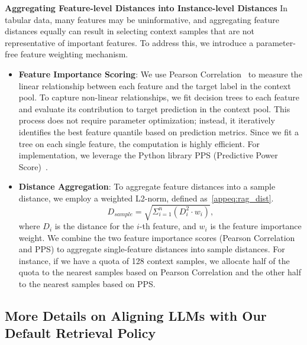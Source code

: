 \textbf{Aggregating Feature-level Distances into Instance-level Distances}
In tabular data, many features may be uninformative, and aggregating feature distances equally can result in selecting context samples that are not representative of important features. To address this, we introduce a parameter-free feature weighting mechanism.
\begin{itemize}
    \item \textbf{Feature Importance Scoring}: We use Pearson Correlation~\citep{cohen2009pearson} to measure the linear relationship between each feature and the target label in the context pool. To capture non-linear relationships, we fit decision trees to each feature and evaluate its contribution to target prediction in the context pool. This process does not require parameter optimization; instead, it iteratively identifies the best feature quantile based on prediction metrics. Since we fit a tree on each single feature, the computation is highly efficient. For implementation, we leverage the Python library PPS (Predictive Power Score)~\citep{florian_wetschoreck_2020_4091345}.
    \item \textbf{Distance Aggregation}: To aggregate feature distances into a sample distance, we employ a weighted L2-norm, defined as~\eqref{appeq:rag_dist}. 
    \begin{equation}
        D_{sample} = \sqrt{\Sigma_{i=1}^{n}(D_{i}^2 \cdot w_i)},
        \label{appeq:rag_dist}
    \end{equation}
    where \( D_i \) is the distance for the \( i \)-th feature, and \( w_i \) is the feature importance weight.
    We combine the two feature importance scores (Pearson Correlation and PPS) to aggregate single-feature distances into sample distances. For instance, if we have a quota of 128 context samples, we allocate half of the quota to the nearest samples based on Pearson Correlation and the other half to the nearest samples based on PPS.
\end{itemize}


\subsection{More Details on Aligning LLMs with Our Default Retrieval Policy}
\label{app:method_align_rag_llm}

